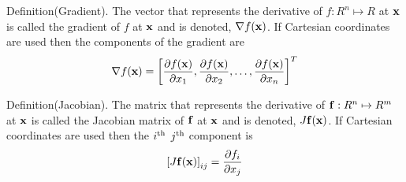 \proclaim Definition(Gradient). The vector that represents the derivative 
of $f: R^n \mapsto R$ at ${\bf x\/}$ is called the gradient of $f$ 
at ${\bf x\/}$ and is denoted, 
$\nabla f({\bf x\/})$. If Cartesian coordinates are used then the components 
of the gradient are 
$$
\nabla f({\bf x\/}) = \left[{\partial f({\bf x\/}) \over \partial x_1}, 
{\partial f({\bf x\/}) \over \partial x_2}, \ldots, 
{\partial f({\bf x\/}) \over \partial x_n}\right]^T 
$$

\proclaim Definition(Jacobian). The matrix that represents the derivative 
of ${\bf f\/}: R^n \mapsto R^m$ at ${\bf x\/}$ is called the 
Jacobian matrix of ${\bf f\/}$ 
at ${\bf x\/}$ and is denoted, 
$J {\bf f\/}({\bf x\/})$. If Cartesian coordinates are
used then the $i^{\rm th\/}$
$j^{\rm th\/}$ component is
$$
\left[J{\bf f\/}({\bf x\/})\right]_{ij} = {\partial f_i \over \partial x_j}
$$



\bye

